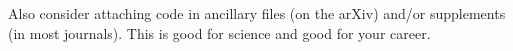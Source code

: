 \documentclass[reprint, aps, prd, letterpaper, noshowpacs, amsmath, %
amssymb, amsfonts, nofootinbib, floatfix, superscriptaddress, %
twoside]{revtex4-1}
\begin{document}
Also consider attaching code in ancillary files (on the arXiv) and/or
supplements (in most journals).  This is good for science and good for
your career.



\vfil


\let\c\Originalcdefinition
\let\d\Originalddefinition
\let\i\Originalidefinition



\end{document}
